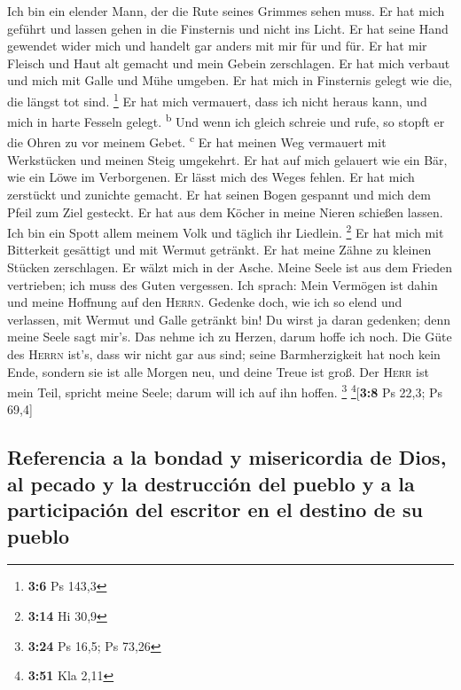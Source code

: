  Ich bin ein elender Mann, der die Rute seines Grimmes
sehen muss.  Er hat mich geführt und lassen gehen in die
Finsternis und nicht ins Licht.  Er hat seine Hand
gewendet wider mich und handelt gar anders mit mir für und für.
 Er hat mir Fleisch und Haut alt gemacht und mein Gebein
zerschlagen.  Er hat mich verbaut und mich mit Galle und
Mühe umgeben.  Er hat mich in Finsternis gelegt wie die,
die längst tot sind. \footnote{\textbf{3:6} Ps 143,3}  Er
hat mich vermauert, dass ich nicht heraus kann, und mich in harte
Fesseln gelegt. \textsuperscript{b}  Und wenn ich gleich
schreie und rufe, so stopft er die Ohren zu vor meinem Gebet.
\textsuperscript{c}  Er hat meinen Weg vermauert mit
Werkstücken und meinen Steig umgekehrt.  Er hat auf mich
gelauert wie ein Bär, wie ein Löwe im Verborgenen.  Er
lässt mich des Weges fehlen. Er hat mich zerstückt und zunichte gemacht.
 Er hat seinen Bogen gespannt und mich dem Pfeil zum Ziel
gesteckt.  Er hat aus dem Köcher in meine Nieren schießen
lassen.  Ich bin ein Spott allem meinem Volk und täglich
ihr Liedlein. \footnote{\textbf{3:14} Hi 30,9}  Er hat
mich mit Bitterkeit gesättigt und mit Wermut getränkt. 
Er hat meine Zähne zu kleinen Stücken zerschlagen. Er wälzt mich in der
Asche.  Meine Seele ist aus dem Frieden vertrieben; ich
muss des Guten vergessen.  Ich sprach: Mein Vermögen ist
dahin und meine Hoffnung auf den \textsc{Herrn}.  Gedenke
doch, wie ich so elend und verlassen, mit Wermut und Galle getränkt bin!
 Du wirst ja daran gedenken; denn meine Seele sagt mir's.
 Das nehme ich zu Herzen, darum hoffe ich noch.
 Die Güte des \textsc{Herrn} ist's, dass wir nicht gar
aus sind; seine Barmherzigkeit hat noch kein Ende, 
sondern sie ist alle Morgen neu, und deine Treue ist groß.
 Der \textsc{Herr} ist mein Teil, spricht meine Seele;
darum will ich auf ihn hoffen. \footnote{\textbf{3:24} Ps 16,5; Ps 73,26}
\footnote{\textbf{3:51} Kla 2,11}{[}\textbf{3:8} Ps 22,3; Ps 69,4{]}

\hypertarget{referencia-a-la-bondad-y-misericordia-de-dios-al-pecado-y-la-destrucciuxf3n-del-pueblo-y-a-la-participaciuxf3n-del-escritor-en-el-destino-de-su-pueblo}{%
\subsection{Referencia a la bondad y misericordia de Dios, al pecado y
la destrucción del pueblo y a la participación del escritor en el
destino de su
pueblo}\label{referencia-a-la-bondad-y-misericordia-de-dios-al-pecado-y-la-destrucciuxf3n-del-pueblo-y-a-la-participaciuxf3n-del-escritor-en-el-destino-de-su-pueblo}}

